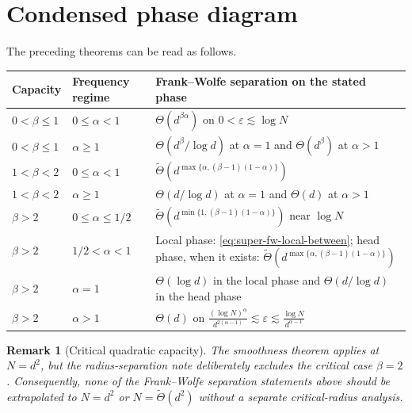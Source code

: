 \documentclass[11pt]{article}
\newtheorem{remark}[theorem]{Remark}
\newcommand{\eps}{\varepsilon}
\begin{document}
\section{Condensed phase diagram}

The preceding theorems can be read as follows.

\begin{center}
\small
\renewcommand{\arraystretch}{1.35}
\begin{tabularx}{\textwidth}{>{\raggedright\arraybackslash}p{}
>{\raggedright\arraybackslash}p{}
>{\raggedright\arraybackslash}X}
\toprule
Capacity & Frequency regime & Frank--Wolfe separation on the stated phase\\
\midrule
$0<\beta\leq1$
& $0\leq\alpha<1$
& $\Theta(d^{\beta\alpha})$ on
$0<\eps\lesssim\log N$\\

$0<\beta\leq1$
& $\alpha\geq1$
& $\Theta(d^\beta/\log d)$ at $\alpha=1$ and
$\Theta(d^\beta)$ at $\alpha>1$\\

$1<\beta<2$
& $0\leq\alpha<1$
& $\widetilde\Theta\!\left(
 d^{\max\{\alpha,(\beta-1)(1-\alpha)\}}
 \right)$\\

$1<\beta<2$
& $\alpha\geq1$
& $\Theta(d/\log d)$ at $\alpha=1$ and $\Theta(d)$ at $\alpha>1$\\

$\beta>2$
& $0\leq\alpha\leq1/2$
& $\widetilde\Theta\!\left(
 d^{\min\{1,(\beta-1)(1-\alpha)\}}
 \right)$ near $\log N$\\

$\beta>2$
& $1/2<\alpha<1$
& Local phase: \eqref{eq:super-fw-local-between};
head phase, when it exists:
$\widetilde\Theta\!\left(
 d^{\max\{\alpha,(\beta-1)(1-\alpha)\}}
 \right)$\\

$\beta>2$
& $\alpha=1$
& $\Theta(\log d)$ in the local phase and
$\Theta(d/\log d)$ in the head phase\\

$\beta>2$
& $\alpha>1$
& $\Theta(d)$ on
$\frac{(\log N)^\alpha}{d^{2(\alpha-1)}}
\lesssim\eps\lesssim
\frac{\log N}{d^{\alpha-1}}$\\
\bottomrule
\end{tabularx}
\end{center}

\begin{remark}[Critical quadratic capacity]
The smoothness theorem applies at $N=d^2$, but the radius-separation
note deliberately excludes the critical case $\beta=2$.  Consequently,
none of the Frank--Wolfe separation statements above should be
extrapolated to $N=d^2$ or $N=\widetilde\Theta(d^2)$ without a separate
critical-radius analysis.
\end{remark}
\end{document}
